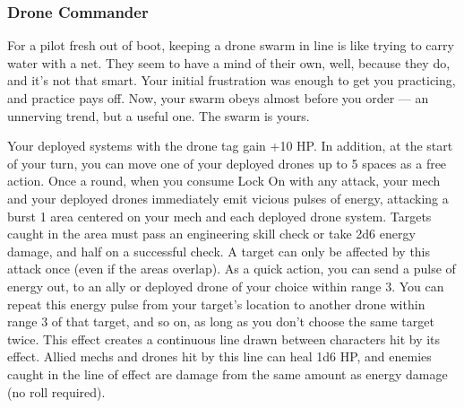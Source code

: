\subsubsection{Drone Commander}

\begin{talent}
{For a pilot fresh out of boot, keeping a drone swarm in line is like trying to carry water with a net. They seem to have a mind of their own, well, because they do, and it's not that smart. Your initial frustration was enough to get you practicing, and practice pays off. Now, your swarm obeys almost before you order — an unnerving trend, but a useful one. The swarm is yours.}

Your deployed systems with the drone tag gain +10 HP. In addition, at the start of your turn, you can move one of your deployed drones up to 5 spaces as a free action.
Once a round, when you consume Lock On with any attack, your mech and your deployed drones immediately emit vicious pulses of energy, attacking a burst 1 area centered on your mech and each deployed drone system. Targets caught in the area must pass an engineering skill check or take 2d6 energy damage, and half on a successful check. A target can only be affected by this attack once (even if the areas overlap). 
As a quick action, you can send a pulse of energy out, to an ally or deployed drone of your choice within range 3. You can repeat this energy pulse from your target's location to another drone within range 3 of that target, and so on, as long as you don't choose the same target twice. This effect creates a continuous line drawn between characters hit by its effect. Allied mechs and drones hit by this line can heal 1d6 HP, and enemies caught in the line of effect are damage from the same amount as energy damage (no roll required).
\end{talent}
